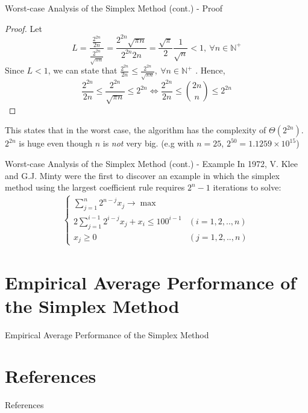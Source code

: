 \documentclass[10pt]{beamer}
\begin{document}
\begin{frame}{Worst-case Analysis of the Simplex Method (cont.) - Proof}
\begin{proof}
Let
$$
\displaystyle
L = \frac{\frac{2^{2n}}{2n}}{\frac{2^{2n}}{\sqrt{\pi n}}} = \frac{2^{2n}\sqrt{\pi n}}{2^{2n} 2n} = \frac{\sqrt{\pi}}{2} \frac{1}{\sqrt{n}} < 1,\ \forall n \in \mathbb{N^+}
$$
Since $L < 1$, we can state that $\frac{2^{2n}}{2n} \leq \frac{2^{2n}}{\sqrt{\pi n}},\ \forall n \in \mathbb{N^+}
$
. Hence,
$$
\displaystyle
\frac{2^{2n}}{2n} \leq \frac{2^{2n}}{\sqrt{\pi n}} \leq 2^{2n} \iff \frac{2^{2n}}{2n} \leq {2n \choose n} \leq 2^{2n}
$$
\end{proof}
This states that in the worst case, the algorithm has the complexity of $\Theta(2^{2n})$. $2^{2n}$ is huge even though $n$ is \textit{not} very big. (e.g with $n = 25$, $2^{50} = 1.1259\times 10^{15}$)
\end{frame}

\begin{frame}{Worst-case Analysis of the Simplex Method (cont.) - Example}
In 1972, V. Klee and G.J. Minty were the first to discover an example in which the
simplex method using the largest coefficient rule requires $2^n - 1$ iterations to solve:
\begin{equation*}
\begin{aligned}
\begin{cases}
\sum_{j = 1}^{n} 2^{n - j} x_j \rightarrow \max \\
2\sum_{j = 1}^{i - 1} 2^{i - j}x_j + x_i \leq 100^{i - 1} & (i = 1, 2, .., n)\\
x_j \geq 0 & (j = 1, 2, .., n)
\end{cases}
\end{aligned}
\end{equation*}
\end{frame}

\section{Empirical Average Performance of the Simplex Method}
\begin{frame}{Empirical Average Performance of the Simplex Method}

\end{frame}

\section{References}
\begin{frame}[allowframebreaks]{References}
\printbibliography
\end{frame}
\end{document}
